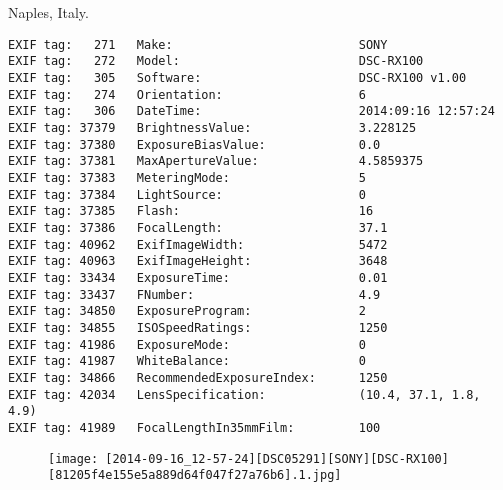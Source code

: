 \section{\protect{}}
\noindent Naples, Italy.
\noindent
\begin{lstlisting}
EXIF tag:   271   Make:                          SONY
EXIF tag:   272   Model:                         DSC-RX100
EXIF tag:   305   Software:                      DSC-RX100 v1.00
EXIF tag:   274   Orientation:                   6
EXIF tag:   306   DateTime:                      2014:09:16 12:57:24
EXIF tag: 37379   BrightnessValue:               3.228125
EXIF tag: 37380   ExposureBiasValue:             0.0
EXIF tag: 37381   MaxApertureValue:              4.5859375
EXIF tag: 37383   MeteringMode:                  5
EXIF tag: 37384   LightSource:                   0
EXIF tag: 37385   Flash:                         16
EXIF tag: 37386   FocalLength:                   37.1
EXIF tag: 40962   ExifImageWidth:                5472
EXIF tag: 40963   ExifImageHeight:               3648
EXIF tag: 33434   ExposureTime:                  0.01
EXIF tag: 33437   FNumber:                       4.9
EXIF tag: 34850   ExposureProgram:               2
EXIF tag: 34855   ISOSpeedRatings:               1250
EXIF tag: 41986   ExposureMode:                  0
EXIF tag: 41987   WhiteBalance:                  0
EXIF tag: 34866   RecommendedExposureIndex:      1250
EXIF tag: 42034   LensSpecification:             (10.4, 37.1, 1.8, 4.9)
EXIF tag: 41989   FocalLengthIn35mmFilm:         100

\end{lstlisting}
\clearpage
\begin{figure}
\raggedleft
\texttt{[image: [2014-09-16\_12-57-24][DSC05291][SONY][DSC-RX100][81205f4e155e5a889d64f047f27a76b6].1.jpg]}
\end{figure}


\clearpage
